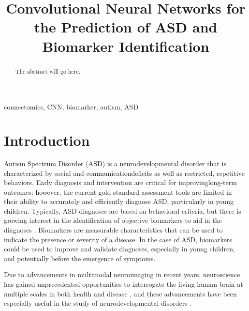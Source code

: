 \documentclass[conference]{IEEEtran}
\begin{document}
\title{Convolutional Neural Networks for the Prediction of ASD and 
       Biomarker Identification}

\author{
}

\maketitle

\begin{abstract}
    The abstract will go here.
\end{abstract}

\begin{IEEEkeywords}
    connectomics, CNN, biomarker, autism, ASD
\end{IEEEkeywords}


\section{Introduction}

Autism Spectrum Disorder (ASD) is a neurodevelopmental disorder that is characterized by 
social and communicationdeficits as well as restricted, repetitive behaviors. Early 
diagnosis and intervention are critical for improvinglong-term outcomes; however, the 
current gold standard assessment tools are limited in their ability to accurately and 
efficiently diagnose ASD, particularly in young children. Typically, ASD diagnoses are 
based on behavioral criteria, but there is growing interest in the identification of 
objective biomarkers to aid in the diagnoses \cite{Shen.2019}. Biomarkers are measurable 
characteristics that can be used to indicate the presence or severity of a disease. In the 
case of ASD, biomarkers could be used to improve and validate diagnoses, especially in 
young children, and potentially before the emergence of symptoms.

Due to advancements in multimodal neuroimaging in recent years, neuroscience has gained 
unprecedented opportunities to interrogate the living human brain at multiple scales in 
both health and disease \cite{Hong.2019}, and these advancements have been especially 
useful in the study of neurodevelopmental disorders \cite{Nunes.2019}.
\end{document}
